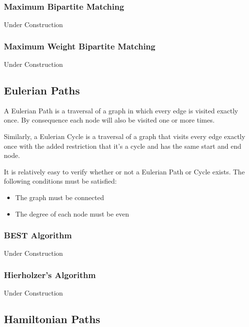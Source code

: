 \subsubsection{Maximum Bipartite Matching}
 

Under Construction

\subsubsection{Maximum Weight Bipartite Matching}
  

Under Construction

\subsection{Eulerian Paths}
 

A Eulerian Path is a traversal of a graph in which every edge is visited exactly once. By consequence each node will also be visited one or more times.

Similarly, a Eulerian Cycle is a traversal of a graph that visits every edge exactly once with the added restriction that it's a cycle and has the same start and end node.

It is relatively easy to verify whether or not a Eulerian Path or Cycle exists. The following conditions must be satisfied:
\begin{itemize}
\item The graph must be connected
\item The degree of each node must be even
\end{itemize}

\subsubsection{BEST Algorithm}

Under Construction

\subsubsection{Hierholzer's Algorithm}

Under Construction

\subsection{Hamiltonian Paths}
 

